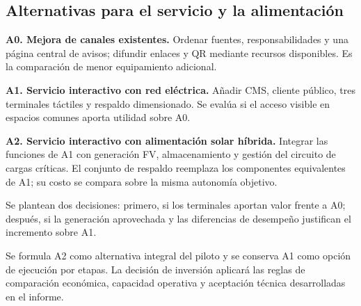 \subsection{Alternativas para el servicio y la alimentación}
\textbf{A0. Mejora de canales existentes.} Ordenar fuentes, responsabilidades y una página central de avisos; difundir enlaces y QR mediante recursos disponibles. Es la comparación de menor equipamiento adicional.

\textbf{A1. Servicio interactivo con red eléctrica.} Añadir CMS, cliente público, tres terminales táctiles y respaldo dimensionado. Se evalúa si el acceso visible en espacios comunes aporta utilidad sobre A0.

\textbf{A2. Servicio interactivo con alimentación solar híbrida.} Integrar las funciones de A1 con generación FV, almacenamiento y gestión del circuito de cargas críticas. El conjunto de respaldo reemplaza los componentes equivalentes de A1; su costo se compara sobre la misma autonomía objetivo.

Se plantean dos decisiones: primero, si los terminales aportan valor frente a A0; después, si la generación aprovechada y las diferencias de desempeño justifican el incremento sobre A1.

Se formula A2 como alternativa integral del piloto y se conserva A1 como opción de ejecución por etapas. La decisión de inversión aplicará las reglas de comparación económica, capacidad operativa y aceptación técnica desarrolladas en el informe.

